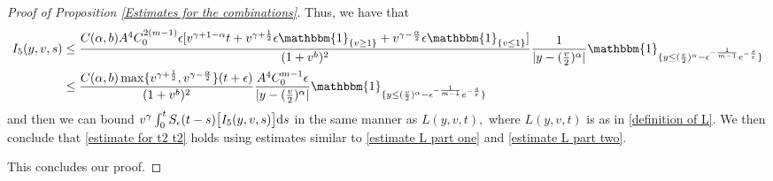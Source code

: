 \documentclass[11pt]{article}
\numberwithin{equation}{section}
\newcommand{\der}{\textup{d}}
\begin{document}
\begin{proof}[Proof of Proposition \ref{Estimates for the combinations}]
Thus, we have that
\begin{align*}
       I_{5}(y,v,s)&\leq  \frac{C(\alpha,b)A^{4}C_{0}^{2(m-1)}\epsilon  [v^{\gamma+1-\alpha}t+v^{\gamma+\frac{1}{2}}\epsilon\mathbbm{1}_{\{v\geq 1\}} +v^{\gamma-\frac{\alpha}{2}}\epsilon\mathbbm{1}_{\{v\leq 1\}} ]}{(1+v^{b})^{2}}\frac{1}{|y-(\frac{v}{2})^{\alpha}|}\mathbbm{1}_{\{y\leq (\frac{v}{2})^{\alpha}-\epsilon^{-\frac{1}{m-1}}e^{-\frac{s}{\epsilon}}\}}\\
       &\leq  \frac{C(\alpha,b) \max\{v^{\gamma+\frac{1}{2}},v^{\gamma-\frac{\alpha}{2}}\}(t+\epsilon)}{(1+v^{b})^{2}}\frac{A^{4}C_{0}^{m-1}\epsilon}{|y-(\frac{v}{2})^{\alpha}|}\mathbbm{1}_{\{y\leq (\frac{v}{2})^{\alpha}-\epsilon^{-\frac{1}{m-1}}e^{-\frac{s}{\epsilon}}\}}
\end{align*}
and then we can bound  $ v^{\gamma}\int_{0}^{t}S_{\epsilon}(t-s)\big[ I_{5}(y,v,s)\big]\der s$ in the same manner as $ L(y,v,t),$ where $L(y,v,t)$ is as in \eqref{definition of L}. We then conclude that \eqref{estimate for t2 t2} holds using estimates similar to  \eqref{estimate L part one} and \eqref{estimate L part two}.




This concludes our proof.
\end{proof}
\end{document}
